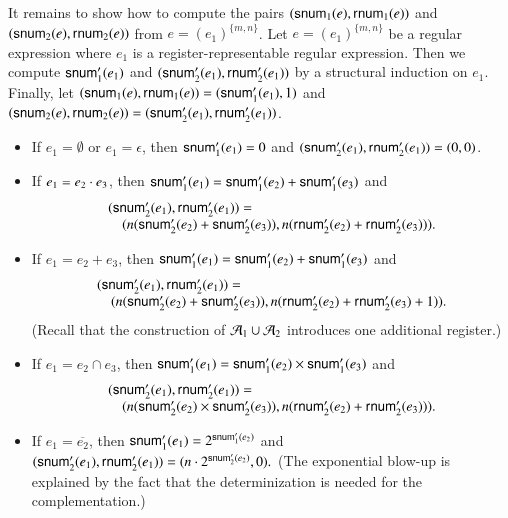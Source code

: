It remains to show how to compute the pairs $({\sf snum}_1(e), {\sf rnum}_1(e))$ and $({\sf snum}_2(e), {\sf rnum}_2(e))$ from $e=(e_1)^{\{m,n\}}$. Let $e=(e_1)^{\{m,n\}}$ be a regular expression where $e_1$ is a register-representable regular expression. Then we compute ${\sf snum}'_1(e_1)$ and $({\sf snum}'_2(e_1), {\sf rnum}'_2(e_1))$ by a structural induction on $e_1$. Finally, let $({\sf snum}_1(e), {\sf rnum}_1(e)) = ({\sf snum}'_1(e_1), 1)$ and $({\sf snum}_2(e), {\sf rnum}_2(e)) = ({\sf snum}'_2(e_1), {\sf rnum}'_2(e_1))$.
\begin{itemize}
  \item If $e_1 = \emptyset$ or $e_1 = \epsilon$, then ${\sf snum}'_1(e_1)  = 0$ and $({\sf snum}'_2(e_1), {\sf rnum}'_2(e_1))  = (0, 0)$. 
%
  \item If $e_1 = e_2 \cdot e_3$, then ${\sf snum}'_1(e_1) = {\sf snum}'_1(e_2) + {\sf snum}'_1(e_3)$ and 
%
  $$
  \begin{array}{l }
  ({\sf snum}'_2(e_1), {\sf rnum}'_2(e_1)) =  \\
  \ \ \ \ (n({\sf snum}'_2(e_2) + {\sf snum}'_2(e_3)), n({\sf rnum}'_2(e_2) + {\sf rnum}'_2(e_3))).
 \end{array}
  $$
%
 \item If $e_1 = e_2 + e_3$, then ${\sf snum}'_1(e_1) = {\sf snum}'_1(e_2) + {\sf snum}'_1(e_3)$ and 
%
  $$
  \begin{array}{l }
  ({\sf snum}'_2(e_1), {\sf rnum}'_2(e_1)) =  \\
  \ \ \ \ (n({\sf snum}'_2(e_2) + {\sf snum}'_2(e_3)), n({\sf rnum}'_2(e_2) + {\sf rnum}'_2(e_3)+1)).
 \end{array}
  $$
  (Recall that the construction of $\mathcal{A}_1 \cup \mathcal{A}_2$ introduces one additional register.)
%
 \item If $e_1 = e_2 \cap e_3$, then ${\sf snum}'_1(e_1) = {\sf snum}'_1(e_2) \times {\sf snum}'_1(e_3)$ and 
%
  $$
  \begin{array}{l }
  ({\sf snum}'_2(e_1), {\sf rnum}'_2(e_1)) =  \\
  \ \ \ \ (n({\sf snum}'_2(e_2) \times {\sf snum}'_2(e_3)), n({\sf rnum}'_2(e_2) + {\sf rnum}'_2(e_3))).
 \end{array}
  $$
%
 \item If $e_1 = \overline{e_2}$, then ${\sf snum}'_1(e_1) = 2^{{\sf snum}'_1(e_2)}$ and 
%
  $
  ({\sf snum}'_2(e_1), {\sf rnum}'_2(e_1)) =  (n \cdot 2^{{\sf snum}'_2(e_2)}, 0).
  $
 (The exponential blow-up is explained by the fact that the determinization is needed for the complementation.) 
%

\end{itemize}
